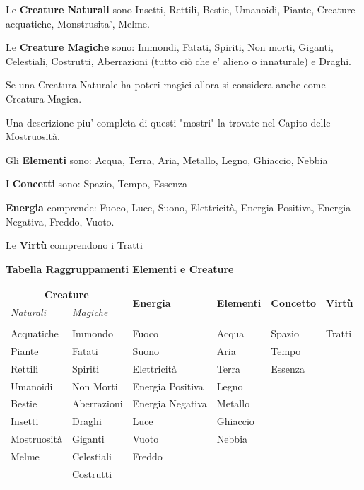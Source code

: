 \documentclass[a4paper,11pt,twoside,openany]{book}
\begin{document}
Le \textbf{Creature Naturali} sono Insetti, Rettili, Bestie, Umanoidi, Piante, Creature acquatiche, Monstrusita', Melme.

Le \textbf{Creature Magiche} sono: Immondi, Fatati, Spiriti, Non morti, Giganti, Celestiali, Costrutti, Aberrazioni (tutto ciò che e' alieno o innaturale) e Draghi.

Se una Creatura Naturale ha poteri magici allora si considera anche come Creatura Magica.

Una descrizione piu' completa di questi "mostri" la trovate nel Capito delle Mostruosità.

Gli \textbf{Elementi} sono: Acqua, Terra, Aria, Metallo, Legno, Ghiaccio, Nebbia

I \textbf{Concetti} sono: Spazio, Tempo, Essenza

\textbf{Energia} comprende: Fuoco, Luce, Suono, Elettricità, Energia Positiva, Energia Negativa, Freddo, Vuoto.

Le \textbf{Virtù} comprendono i Tratti


\bigskip

\textbf{Tabella Raggruppamenti Elementi e Creature}

\medskip
\begin{tabular}{llllll}
\toprule
	\multicolumn{2}{c}{\textbf{Creature}} &\multirow{2}{*}{\textbf{Energia}}  &\multirow{2}{*}{\textbf{Elementi}}  
	&\multirow{2}{*}{\textbf{Concetto}} &\multirow{2}{*}{\textbf{Virtù}}\\
	\textit{Naturali}& \textit{Magiche} \\
	\hline
	\\
Acquatiche  & Immondo   	& Fuoco  			& Acqua 	& Spazio    & Tratti\\
Piante      & Fatati   		& Suono  			& Aria   	& Tempo    	& \\
Rettili     & Spiriti   	& Elettricità      	& Terra     & Essenza   & \\
Umanoidi    & Non Morti 	& Energia Positiva 	& Legno     & 			& \\
Bestie   	& Aberrazioni   & Energia Negativa 	& Metallo   &  			& \\
Insetti		& Draghi		& Luce				& Ghiaccio 	&			& \\
Mostruosità & Giganti     	& Vuoto  			& Nebbia 	&           & \\
Melme		& Celestiali    & Freddo 			&		    &           & \\
			& Costrutti     &        			&		    &           & \\
\end{tabular}
\end{document}
